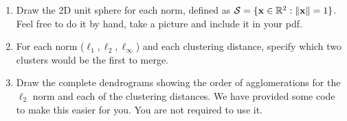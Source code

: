 \documentclass[submit]{harvardml}
\begin{document}
\begin{problem}
  \begin{enumerate}
    \item Draw the 2D unit sphere for each norm, defined as $\mathcal{S} =
        \{\mathbf{x} \in \mathbb{R}^2: \|\mathbf{x}\| = 1 \}$. Feel free to do it by
        hand, take a picture and include it in your pdf.
    \item  For each norm ($\ell_1, \ell_2, \ell_\infty$) and each clustering
        distance, specify which two clusters would be the first to merge.
    \item Draw the complete dendrograms showing the order of agglomerations for
        the $\ell_2$ norm and each of the clustering distances. We have
        provided some code to make this easier for you. You are not required to
        use it.
  \end{enumerate}

\end{problem}
\end{document}
